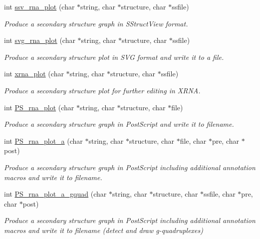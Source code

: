 \begin{DoxyCompactItemize}
int \hyperlink{group__plotting__utils_gadd368528755f9a830727b680243541df}{ssv\+\_\+rna\+\_\+plot} (char $\ast$string, char $\ast$structure, char $\ast$ssfile)
\begin{DoxyCompactList}\small\item\em Produce a secondary structure graph in S\+Struct\+View format. \end{DoxyCompactList}\item 
int \hyperlink{group__plotting__utils_gae7853539b5df98f294b4af434e979304}{svg\+\_\+rna\+\_\+plot} (char $\ast$string, char $\ast$structure, char $\ast$ssfile)
\begin{DoxyCompactList}\small\item\em Produce a secondary structure plot in S\+VG format and write it to a file. \end{DoxyCompactList}\item 
int \hyperlink{group__plotting__utils_ga2f6d5953e6a323df898896b8d6614483}{xrna\+\_\+plot} (char $\ast$string, char $\ast$structure, char $\ast$ssfile)
\begin{DoxyCompactList}\small\item\em Produce a secondary structure plot for further editing in X\+R\+NA. \end{DoxyCompactList}\item 
int \hyperlink{group__plotting__utils_ga0873c7cc4cd7a11c9a2cea19dde7e9c9}{P\+S\+\_\+rna\+\_\+plot} (char $\ast$string, char $\ast$structure, char $\ast$file)
\begin{DoxyCompactList}\small\item\em Produce a secondary structure graph in Post\+Script and write it to \textquotesingle{}filename\textquotesingle{}. \end{DoxyCompactList}\item 
int \hyperlink{group__plotting__utils_ga47856b2504b566588785597b6ebb8271}{P\+S\+\_\+rna\+\_\+plot\+\_\+a} (char $\ast$string, char $\ast$structure, char $\ast$file, char $\ast$pre, char $\ast$post)
\begin{DoxyCompactList}\small\item\em Produce a secondary structure graph in Post\+Script including additional annotation macros and write it to \textquotesingle{}filename\textquotesingle{}. \end{DoxyCompactList}\item 
int \hyperlink{group__plotting__utils_ga32fa0f97625119e9d24dd2e7153abc4f}{P\+S\+\_\+rna\+\_\+plot\+\_\+a\+\_\+gquad} (char $\ast$string, char $\ast$structure, char $\ast$ssfile, char $\ast$pre, char $\ast$post)
\begin{DoxyCompactList}\small\item\em Produce a secondary structure graph in Post\+Script including additional annotation macros and write it to \textquotesingle{}filename\textquotesingle{} (detect and draw g-\/quadruplexes) \end{DoxyCompactList}\end{DoxyCompactItemize}
